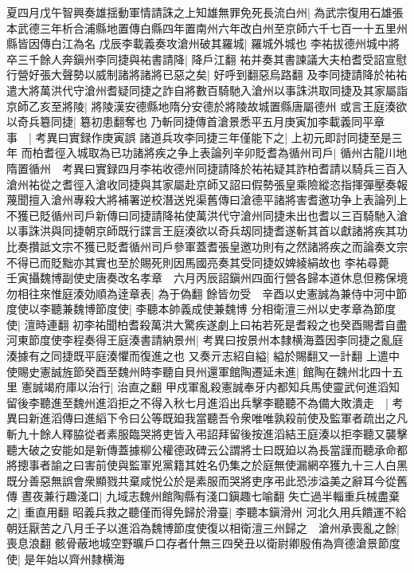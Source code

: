 夏四月戊午智興奏雄揺動軍情請誅之上知雄無罪免死長流白州|{
	為武宗復用石雄張本武德三年析合浦縣地置傳白縣四年置南州六年改白州至京師六千七百一十五里州縣皆因傳白江為名}
戊辰李載義奏攻滄州破其羅城|{
	羅城外城也}
李祐拔德州城中將卒三千餘人奔鎭州李同捷與祐書請降|{
	降戶江翻}
祐并奏其書諫議大夫柏耆受詔宣慰行營好張大聲勢以威制諸將諸將已惡之矣|{
	好呼到翻惡烏路翻}
及李同捷請降於祐祐遣大將萬洪代守滄州耆疑同捷之詐自將數百騎馳入滄州以事誅洪取同捷及其家屬詣京師乙亥至將陵|{
	將陵漢安德縣地隋分安德於將陵故城置縣唐屬德州}
或言王庭湊欲以奇兵簒同捷|{
	簒初患翻奪也}
乃斬同捷傳首滄景悉平五月庚寅加李載義同平章事　|{
	考異曰實録作庚寅誤}
諸道兵攻李同捷三年僅能下之|{
	上初元即討同捷至是三年}
而柏耆徑入城取為已功諸將疾之争上表論列辛卯貶耆為循州司戶|{
	循州古龍川地隋置循州　考異曰實録四月李祐收德州同捷請降於祐祐疑其詐柏耆請以騎兵三百入滄州祐從之耆徑入滄收同捷與其家屬赴京師又詔曰假勢張皇乘險縱恣指揮彈壓奏報蔑聞擅入滄州專殺大將補署逆校潛送兇渠舊傳曰滄德平諸將害耆邀功争上表論列上不獲已貶循州司戶新傳曰同捷請降祐使萬洪代守滄州同捷未出也耆以三百騎馳入滄以事誅洪與同捷朝京師既行諜言王庭湊欲以奇兵刼同捷耆遂斬其首以獻諸將疾其功比奏攢詆文宗不獲已貶耆循州司戶參軍蓋耆張皇邀功則有之然諸將疾之而論奏文宗不得已而貶黜亦其實也至於賜死則因馬國亮奏其受同捷奴婢綾絹故也}
李祐尋薨　壬寅攝魏博副使史唐奏改名孝章　六月丙辰詔鎭州四面行營各歸本道休息但務保境勿相往來惟庭湊効順為逹章表|{
	為于偽翻}
餘皆勿受　辛酉以史憲誠為兼侍中河中節度使以李聽兼魏博節度使|{
	李聽本帥義成使兼魏博}
分相衛澶三州以史孝章為節度使|{
	澶時連翻}
初李祐聞柏耆殺萬洪大驚疾遂劇上曰祐若死是耆殺之也癸酉賜耆自盡　河東節度使李程奏得王庭湊書請納景州|{
	考異曰按景州本隸横海蓋因李同捷之亂庭湊據有之同捷既平庭湊懼而復進之也}
又奏亓志紹自縊|{
	縊於賜翻又一計翻}
上遣中使賜史憲誠旌節癸酉至魏州時李聽自貝州還軍館陶遷延未進|{
	館陶在魏州北四十五里}
憲誠竭府庫以治行|{
	治直之翻}
甲戍軍亂殺憲誠奉牙内都知兵馬使靈武何進滔知留後李聽進至魏州進滔拒之不得入秋七月進滔出兵擊李聽聽不為備大敗潰走　|{
	考異曰新進滔傳曰進縚下令曰公等既廹我當聽吾令衆唯唯孰殺前使及監軍者疏出之凡斬九十餘人釋脇從者素服臨哭將吏皆入弔詔拜留後按進滔結王庭湊以拒李聽又襲擊聽大破之安能如是新傳蓋據柳公權德政碑云公謂將士曰既廹以為長當謹而聽承命都將摠事者諭之曰害前使與監軍兇黨籍其姓名仍集之於庭無使漏網卒獲九十三人白黑既分善惡無誤會衆顯戮共棄咸悦公於是素服而哭將吏序弔此恐涉溢美之辭耳今從舊傳}
晝夜兼行趣淺口|{
	九域志魏州館陶縣有淺口鎭趣七喻翻}
失亡過半輜重兵械盡棄之|{
	重直用翻}
昭義兵救之聽僅而得免歸於滑臺|{
	李聽本鎭滑州}
河北久用兵饋運不給朝廷厭苦之八月壬子以進滔為魏博節度使復以相衛澶三州歸之　滄州承喪亂之餘|{
	喪息浪翻}
骸骨蔽地城空野曠戶口存者什無三四癸丑以衛尉卿殷侑為齊德滄景節度使|{
	是年始以齊州隸横海}
